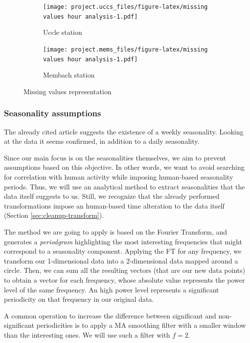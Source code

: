 \documentclass[12pt]{article}
\begin{document}
\begin{figure}[h]
	\begin{subfigure}{.5\linewidth}
		\texttt{[image: project.uccs\_files/figure-latex/missing values hour analysis-1.pdf]}
		\caption{Uccle station}
		\label{missing-values-seconds:uccs}
	\end{subfigure}
	\begin{subfigure}{.5\linewidth}
		\texttt{[image: project.mems\_files/figure-latex/missing values hour analysis-1.pdf]}
		\caption{Membach station}
		\label{missing-values-seconds:mems}
	\end{subfigure}
	\caption{Missing values representation}
	\label{missing-values-seconds}
\end{figure}

\subsubsection{Seasonality assumptions}
The already cited article \cite{NatureCoronavirusSeismic} suggests the existence of a weekly seasonality. Looking at the data it seems confirmed, in addition to a daily seasonality.

Since our main focus is on the seasonalities themselves, we aim to prevent assumptions based on this objective. In other words, we want to avoid searching for correlation with human activity while imposing human-based seasonality periods. Thus, we will use an analytical method to extract seasonalities that the data itself suggests to us. Still, we recognize that the already performed transformations impose an human-based time alteration to the data itself (Section \ref{sec:cleanup-transform}).

The method we are going to apply is based on the Fourier Transform, and generates a \textit{periodgram} highlighting the most interesting frequencies that might correspond to a seasonality component.
Applying the FT for any frequency, we transform our 1-dimensional data into a 2-dimensional data mapped around a circle. Then, we can sum all the resulting vectors (that are our new data points) to obtain a vector for each frequency, whose absolute value represents the power level of the same frequency. An high power level represents a significant periodicity on that frequency in our original data.

A common operation to increase the difference between significant and non-significant periodicities is to apply a MA smoothing filter with a smaller window than the interesting ones. We will use such a filter with $f=2$.
\end{document}
